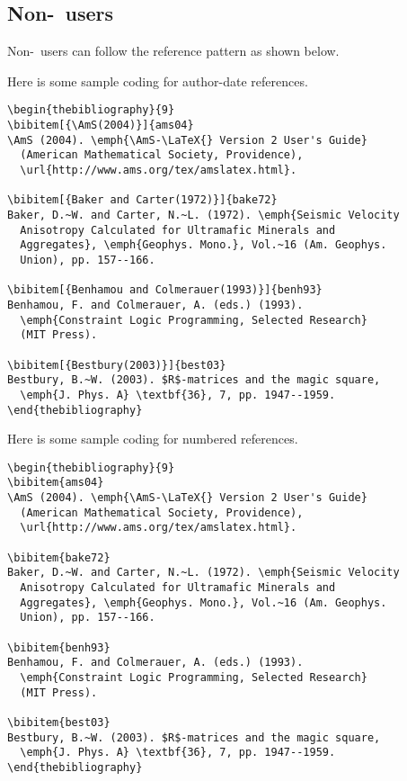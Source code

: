 \subsection{Non-\btex\ users}
Non-\btex\ users can follow the reference pattern as shown below.

Here is some sample coding for author-date references.

\begin{verbatim}
\begin{thebibliography}{9}
\bibitem[{\AmS(2004)}]{ams04}
\AmS (2004). \emph{\AmS-\LaTeX{} Version 2 User's Guide}
  (American Mathematical Society, Providence),
  \url{http://www.ams.org/tex/amslatex.html}.

\bibitem[{Baker and Carter(1972)}]{bake72}
Baker, D.~W. and Carter, N.~L. (1972). \emph{Seismic Velocity
  Anisotropy Calculated for Ultramafic Minerals and
  Aggregates}, \emph{Geophys. Mono.}, Vol.~16 (Am. Geophys.
  Union), pp. 157--166.

\bibitem[{Benhamou and Colmerauer(1993)}]{benh93}
Benhamou, F. and Colmerauer, A. (eds.) (1993).
  \emph{Constraint Logic Programming, Selected Research}
  (MIT Press).

\bibitem[{Bestbury(2003)}]{best03}
Bestbury, B.~W. (2003). $R$-matrices and the magic square,
  \emph{J. Phys. A} \textbf{36}, 7, pp. 1947--1959.
\end{thebibliography}
\end{verbatim}

Here is some sample coding for numbered references.

\begin{verbatim}
\begin{thebibliography}{9}
\bibitem{ams04}
\AmS (2004). \emph{\AmS-\LaTeX{} Version 2 User's Guide}
  (American Mathematical Society, Providence),
  \url{http://www.ams.org/tex/amslatex.html}.

\bibitem{bake72}
Baker, D.~W. and Carter, N.~L. (1972). \emph{Seismic Velocity
  Anisotropy Calculated for Ultramafic Minerals and
  Aggregates}, \emph{Geophys. Mono.}, Vol.~16 (Am. Geophys.
  Union), pp. 157--166.

\bibitem{benh93}
Benhamou, F. and Colmerauer, A. (eds.) (1993).
  \emph{Constraint Logic Programming, Selected Research}
  (MIT Press).

\bibitem{best03}
Bestbury, B.~W. (2003). $R$-matrices and the magic square,
  \emph{J. Phys. A} \textbf{36}, 7, pp. 1947--1959.
\end{thebibliography}
\end{verbatim}

